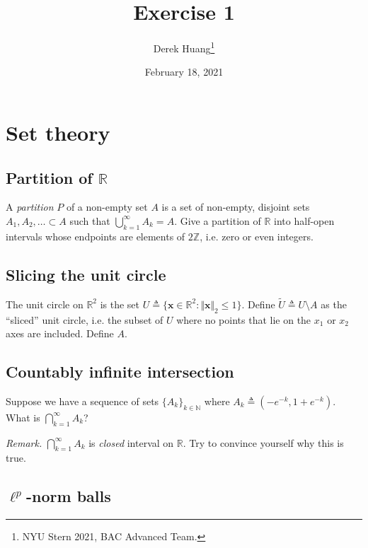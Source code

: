 \documentclass{article}
\title{Exercise 1}
\author{Derek Huang\thanks{NYU Stern 2021, BAC Advanced Team.}}
\date{February 18, 2021}
\numberwithin{equation}{section}
\begin{document}
\maketitle
\thispagestyle{fancy}

\section{Set theory}

\subsection{Partition of $ \mathbb{R} $}

A \textit{partition} $ P $ of a non-empty set $ A $ is a set of non-empty,
disjoint sets $ A_1, A_2, \ldots \subset A $ such that
$ \bigcup_{k = 1}^\infty A_k = A $. Give a partition of $ \mathbb{R} $ into
half-open intervals whose endpoints are elements of $ 2\mathbb{Z} $, i.e. zero
or even integers.

\subsection{Slicing the unit circle}

The unit circle on $ \mathbb{R}^2 $ is the set
$ U \triangleq \{\mathbf{x} \in \mathbb{R}^2 :
\Vert\mathbf{x}\Vert_2 \le 1\} $. Define
$ \tilde{U} \triangleq U \setminus A $ as the ``sliced'' unit circle, i.e. the
subset of $ U $ where no points that lie on the $ x_1 $ or $ x_2 $ axes are
included. Define $ A $.

\subsection{Countably infinite intersection}

Suppose we have a sequence of sets $ \{A_k\}_{k \in \mathbb{N}} $ where
$ A_k \triangleq \left(-e^{-k}, 1 + e^{-k}\right) $. What is
$ \bigcap_{k = 1}^\infty A_k $?

\medskip

\textit{Remark.} $ \bigcap_{k = 1}^\infty A_k $ is \textit{closed} interval
on $ \mathbb{R} $. Try to convince yourself why this is true.

\subsection{$ \ell^p $-norm balls}
\end{document}
